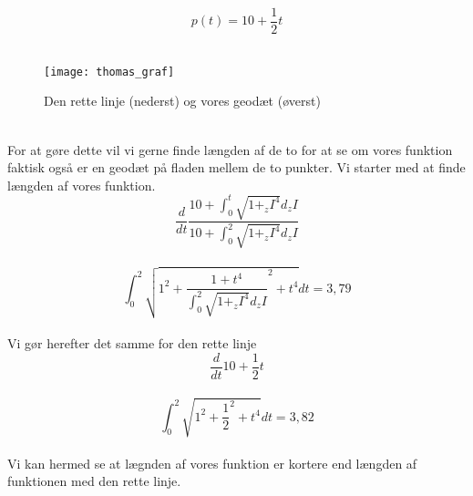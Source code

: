 $$p(t)=10+ \frac{1}{2}t $$ \\
\begin{figure}
  \caption{Den rette linje (nederst) og vores geodæt (øverst)}
  \centering
    \texttt{[image: thomas\_graf]}
\end{figure} \\
For at gøre dette vil vi gerne finde længden af de to for at se om vores funktion faktisk også er en geodæt på fladen mellem de to punkter. Vi starter med at finde længden af vores funktion. \\
$$ \frac{d}{dt} \frac{10+\int_{0}^{t}\sqrt{1+_zI^4}d_zI}{10+\int_{0}^{2}\sqrt{1+_zI^4}d_zI}$$ \\
$$ \int_{0}^{2}\sqrt{1^2+ \frac{1+t^4}{\int_{0}^{2}\sqrt{1+_zI^4}d_zI}^2+t^4}dt=3,79  $$\\
Vi gør herefter det samme for den rette linje \\
$$ \frac{d}{dt}10+ \frac{1}{2}t $$\\
$$\int_{0}^{2}\sqrt{1^2+\frac{1}{2}^2+t^4}dt=3,82 $$\\
Vi kan hermed se at lægnden af vores funktion er kortere end længden af funktionen med den rette linje.
